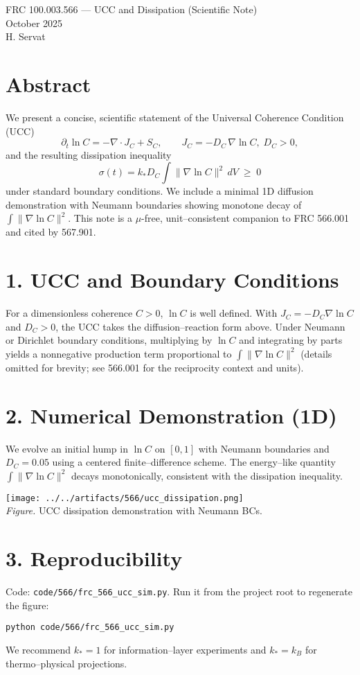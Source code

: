 \documentclass[10pt]{article}
\begin{document}
\begin{center}
{\Large FRC 100.003.566 — UCC and Dissipation (Scientific Note)}\\
{\large October 2025}\\[4pt]
H. Servat
\end{center}

\section*{Abstract}
We present a concise, scientific statement of the Universal Coherence Condition (UCC)
\begin{equation}
 \partial_t \ln C = -\nabla\!\cdot J_C + S_C,\qquad J_C = -D_C\,\nabla \ln C,\; D_C>0,
\end{equation}
and the resulting dissipation inequality
\begin{equation}
 \sigma(t) = k_* D_C \int \|\nabla\ln C\|^2\, dV \;\ge\; 0
\end{equation}
under standard boundary conditions. We include a minimal 1D diffusion demonstration with Neumann boundaries showing monotone decay of $\int\|\nabla\ln C\|^2$. This note is a $\mu$-free, unit–consistent companion to FRC 566.001 and cited by 567.901.

\section*{1. UCC and Boundary Conditions}
For a dimensionless coherence $C>0$, $\ln C$ is well defined. With $J_C=-D_C\nabla\ln C$ and $D_C>0$, the UCC takes the diffusion–reaction form above. Under Neumann or Dirichlet boundary conditions, multiplying by $\ln C$ and integrating by parts yields a nonnegative production term proportional to $\int\|\nabla\ln C\|^2$ (details omitted for brevity; see 566.001 for the reciprocity context and units).

\section*{2. Numerical Demonstration (1D)}
We evolve an initial hump in $\ln C$ on $[0,1]$ with Neumann boundaries and $D_C=0.05$ using a centered finite–difference scheme. The energy–like quantity $\int\|\nabla\ln C\|^2$ decays monotonically, consistent with the dissipation inequality.

\begin{center}
\texttt{[image: ../../artifacts/566/ucc\_dissipation.png]}\\
\emph{Figure.} UCC dissipation demonstration with Neumann BCs.
\end{center}

\section*{3. Reproducibility}
Code: \verb|code/566/frc_566_ucc_sim.py|. Run it from the project root to regenerate the figure:
\begin{verbatim}
python code/566/frc_566_ucc_sim.py
\end{verbatim}
We recommend $k_*=1$ for information–layer experiments and $k_*=k_B$ for thermo–physical projections.
\end{document}

